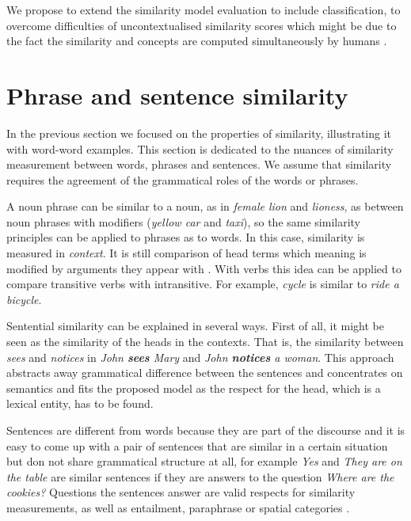 \documentclass[11pt]{article}
\begin{document}
We propose to extend the similarity model evaluation to include classification, to overcome difficulties of uncontextualised similarity scores which might be due to the fact the similarity and concepts are computed simultaneously by humans \cite{hahn1997concepts}.

\section{Phrase and sentence similarity}

In the previous section we focused on the properties of similarity, illustrating it with word-word examples. This section is dedicated to the nuances of similarity measurement between words, phrases and sentences. We assume that similarity requires the agreement of the grammatical roles of the words or phrases.

A noun phrase can be similar to a noun, as in \textit{female lion} and \textit{lioness}, as between noun phrases with modifiers (\textit{yellow car} and \textit{taxi}), so the same similarity principles can be applied to phrases as to words. In this case, similarity is measured in \emph{context}. It is still comparison of head terms which meaning is modified by arguments they appear with \cite{Dinu:2010:MDS:1870658.1870771,mitchell2010composition}. With verbs this idea can be applied to compare transitive verbs with
intransitive. For example, \textit{cycle} is similar to \textit{ride a bicycle}.

Sentential similarity can be explained in several ways. First of all, it might be seen as the similarity of the heads in the contexts. That is, the similarity between \textit{sees} and \textit{notices} in \textit{John \textbf{sees} Mary} and \textit{John \textbf{notices} a woman}. This approach abstracts away grammatical difference between the sentences and concentrates on semantics and fits the proposed model as the respect for the head, which is a lexical entity, has to be found.

Sentences are different from words because they are part of the discourse and it is easy to come up with a pair of sentences that are similar in a certain situation but don not share grammatical structure at all, for example \textit{Yes} and \textit{They are on the table} are similar sentences if they are answers to the question \textit{Where are the cookies?} Questions the sentences answer are valid respects for similarity measurements, as well as entailment, paraphrase \cite{White:2015:WSE:2838931.2838932} or spatial categories \cite{ritter-EtAl:2015:*SEM2015}.
\end{document}
